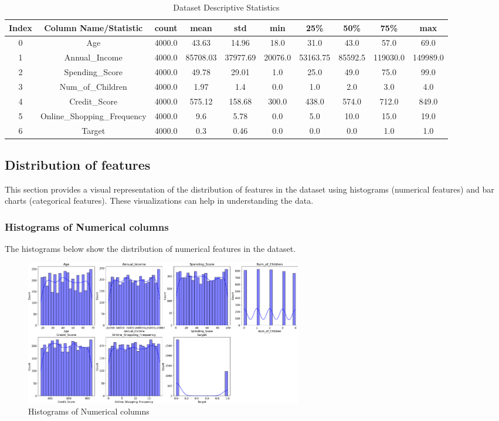 \documentclass{article}%
\begin{document}
\begin{table}[h!]%
\caption{Dataset Descriptive Statistics}%
\vspace{0.2cm}%
\centering%
\begin{tabular}{|c||c||c||c||c||c||c||c||c||c|}%
\hline%
Index&Column Name/Statistic&count&mean&std&min&25\%&50\%&75\%&max\\%
\hline%
0&Age&4000.0&43.63&14.96&18.0&31.0&43.0&57.0&69.0\\%
1&Annual\_Income&4000.0&85708.03&37977.69&20076.0&53163.75&85592.5&119030.0&149989.0\\%
2&Spending\_Score&4000.0&49.78&29.01&1.0&25.0&49.0&75.0&99.0\\%
3&Num\_of\_Children&4000.0&1.97&1.4&0.0&1.0&2.0&3.0&4.0\\%
4&Credit\_Score&4000.0&575.12&158.68&300.0&438.0&574.0&712.0&849.0\\%
5&Online\_Shopping\_Frequency&4000.0&9.6&5.78&0.0&5.0&10.0&15.0&19.0\\%
6&Target&4000.0&0.3&0.46&0.0&0.0&0.0&1.0&1.0\\%
\hline%
\end{tabular}%
\end{table}

%
\newpage%
\subsection{Distribution of features}%
\label{subsec:Distributionoffeatures}%
This section provides a visual representation of the distribution of features in the dataset using histograms (numerical features) and bar charts (categorical features). These visualizations can help in understanding the data.%
\subsubsection{Histograms of Numerical columns}%
\label{ssubsec:HistogramsofNumericalcolumns}%
The histograms below show the distribution of numerical features in the dataset.%


\begin{figure}[h!]%
\centering%
\includegraphics[width=460px]{EDA/histograms.png}%
\caption{Histograms of Numerical columns}%
\end{figure}
\end{document}
